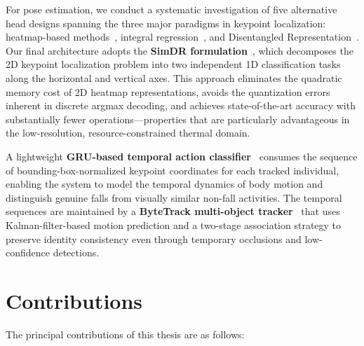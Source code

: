 For pose estimation, we conduct a systematic investigation of five alternative head designs spanning the three major paradigms in keypoint localization: heatmap-based methods~\cite{newell2016stacked, xiao2018simple}, integral regression~\cite{sun2018integral, nibali2018numerical}, and Disentangled Representation~\cite{li20212d}. Our final architecture adopts the \textbf{SimDR formulation}~\cite{li20212d}, which decomposes the 2D keypoint localization problem into two independent 1D classification tasks along the horizontal and vertical axes. This approach eliminates the quadratic memory cost of 2D heatmap representations, avoids the quantization errors inherent in discrete argmax decoding, and achieves state-of-the-art accuracy with substantially fewer operations---properties that are particularly advantageous in the low-resolution, resource-constrained thermal domain.

A lightweight \textbf{GRU-based temporal action classifier}~\cite{cho2014learning} consumes the sequence of bounding-box-normalized keypoint coordinates for each tracked individual, enabling the system to model the temporal dynamics of body motion and distinguish genuine falls from visually similar non-fall activities. The temporal sequences are maintained by a \textbf{ByteTrack multi-object tracker}~\cite{zhang2022bytetrack} that uses Kalman-filter-based motion prediction and a two-stage association strategy to preserve identity consistency even through temporary occlusions and low-confidence detections.

\section{Contributions}
\label{sec:intro_contributions}

The principal contributions of this thesis are as follows:

